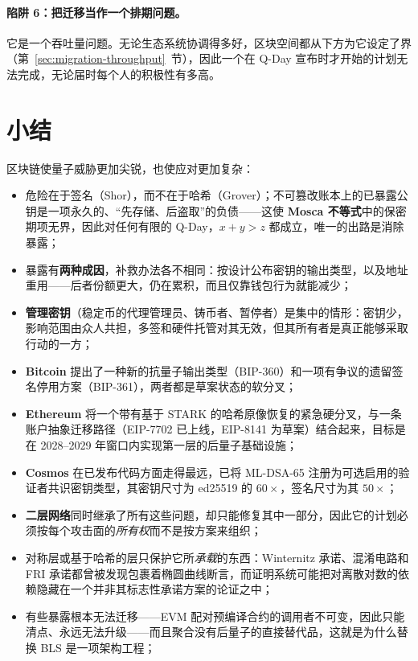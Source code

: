 \paragraph{陷阱 6：把迁移当作一个排期问题。}
它是一个吞吐量问题。无论生态系统协调得多好，区块空间都从下方为它设定了界（第~\ref{sec:migration-throughput}~节），因此一个在 Q-Day 宣布时才开始的计划无法完成，无论届时每个人的积极性有多高。

\section{小结}
区块链使量子威胁更加尖锐，也使应对更加复杂：

\begin{itemize}
  \item 危险在于签名（Shor），而不在于哈希（Grover）；不可篡改账本上的已暴露公钥是一项永久的、“先存储、后盗取”的负债——这使 \textbf{Mosca 不等式}中的保密期项无界，因此对任何有限的 Q-Day，$x+y>z$ 都成立，唯一的出路是消除暴露；
  \item 暴露有\textbf{两种成因}，补救办法各不相同：按设计公布密钥的输出类型，以及地址重用——后者份额更大，仍在累积，而且仅靠钱包行为就能减少；
  \item \textbf{管理密钥}（稳定币的代理管理员、铸币者、暂停者）是集中的情形：密钥少，影响范围由众人共担，多签和硬件托管对其无效，但其所有者是真正能够采取行动的一方；
  \item \textbf{Bitcoin} 提出了一种新的抗量子输出类型（BIP-360）和一项有争议的遗留签名停用方案（BIP-361），两者都是草案状态的软分叉；
  \item \textbf{Ethereum} 将一个带有基于 STARK 的哈希原像恢复的紧急硬分叉，与一条账户抽象迁移路径（EIP-7702 已上线，EIP-8141 为草案）结合起来，目标是在 2028--2029 年窗口内实现第一层的后量子基础设施；
  \item \textbf{Cosmos} 在已发布代码方面走得最远，已将 ML-DSA-65 注册为可选启用的验证者共识密钥类型，其密钥尺寸为 ed25519 的 $60\times$，签名尺寸为其 $50\times$；
  \item \textbf{二层网络}同时继承了所有这些问题，却只能修复其中一部分，因此它的计划必须按每个攻击面的\emph{所有权}而不是按方案来组织；
  \item 对称层或基于哈希的层只保护它所\emph{承载}的东西：Winternitz 承诺、混淆电路和 FRI 承诺都曾被发现包裹着椭圆曲线断言，而证明系统可能把对离散对数的依赖隐藏在一个并非其标志性承诺方案的论证之中；
  \item 有些暴露根本无法迁移——EVM 配对预编译合约的调用者不可变，因此只能清点、永远无法升级——而且聚合没有后量子的直接替代品，这就是为什么替换 BLS 是一项架构工程；

\end{itemize}
